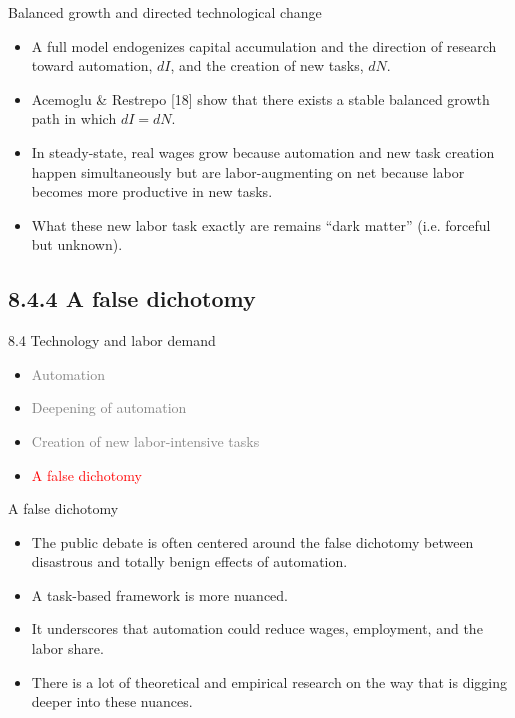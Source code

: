 \documentclass[notes=show]{beamer}
\begin{document}
\begin{frame}{Balanced growth and directed technological change}
\begin{itemize}
\item A full model endogenizes capital accumulation and the direction of research toward automation, $dI$, and the creation of new tasks, $dN$. \medskip
\item Acemoglu \& Restrepo [18] show that there exists a stable balanced growth path in which $dI=dN$. \medskip 
\item In steady-state, real wages grow because automation and new task creation happen simultaneously but are labor-augmenting on net because labor becomes more productive in new tasks. \medskip
\item What these new labor task exactly are remains ``dark matter'' (i.e. forceful but unknown).
\end{itemize}
\end{frame}

\subsection{8.4.4 A false dichotomy}

\begin{frame}{8.4 Technology and labor demand}
\begin{itemize}
\item[\textcolor{gray}{8.4.1}] \textcolor{gray}{Automation} \medskip
\item[\textcolor{gray}{8.4.2}] \textcolor{gray}{Deepening of automation} \medskip
\item[\textcolor{gray}{8.4.3}] \textcolor{gray}{Creation of new labor-intensive tasks} \medskip
\item[\textcolor{red}{8.4.4}] \textcolor{red}{A false dichotomy}
\end{itemize}
\end{frame}

\begin{frame}{A false dichotomy}
\begin{itemize}
\item The public debate is often centered around the false dichotomy between disastrous and totally benign effects of automation. \medskip
\item A task-based framework is more nuanced. \medskip
\item It underscores that automation could reduce wages, employment, and the labor share. \medskip
\item There is a lot of theoretical and empirical research on the way that is digging deeper into these nuances.
\end{itemize}
\end{frame}
\end{document}
